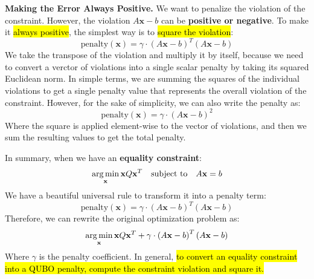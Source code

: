 \highspace
\textcolor{Red2}{ \textbf{Making the Error Always Positive.}} We want to penalize the violation of the constraint. However, the violation $A\mathbf{x} - b$ can be \textbf{positive or negative}. To make it \hl{always positive}, the simplest way is to \hl{square the violation}:
\begin{equation}
    \text{penalty}(\mathbf{x}) =
    \gamma \cdot \left(A\mathbf{x} - b\right)^{T} \left(A\mathbf{x} - b\right)
\end{equation}
We take the transpose of the violation and multiply it by itself, because we need to convert a verctor of violations into a single scalar penalty by taking its squared Euclidean norm. In simple terms, we are summing the squares of the individual violations to get a single penalty value that represents the overall violation of the constraint. However, for the sake of simplicity, we can also write the penalty as:
\begin{equation*}
    \text{penalty}(\mathbf{x}) =
    \gamma \cdot \left(A\mathbf{x} - b\right)^{2}
\end{equation*}
Where the square is applied element-wise to the vector of violations, and then we sum the resulting values to get the total penalty.

\highspace
In summary, when we have an \textbf{equality constraint}:
\begin{equation*}
    \operatorname*{arg\,min}_{\mathbf{x}} \mathbf{x} Q \mathbf{x}^T \quad \text{subject to} \quad A\mathbf{x} = b
\end{equation*}
We have a beautiful universal rule to transform it into a penalty term:
\begin{equation*}
    \text{penalty}(\mathbf{x}) =
    \gamma \cdot \left(A\mathbf{x} - b\right)^{T} \left(A\mathbf{x} - b\right)
\end{equation*}
Therefore, we can rewrite the original optimization problem as:
\begin{equation}
    \operatorname*{arg\,min}_{\mathbf{x}} \mathbf{x} Q \mathbf{x}^T + \gamma \cdot \left(A\mathbf{x} - b\right)^{T} \left(A\mathbf{x} - b\right)
\end{equation}
Where $\gamma$ is the penalty coefficient. In general, \hl{to convert an equality constraint into a QUBO penalty, compute the constraint violation and square it.}

